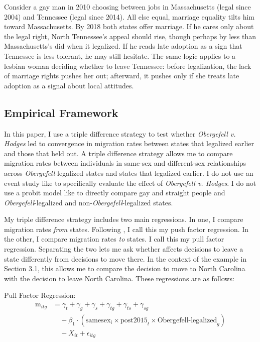 \documentclass[12pt,letterpaper]{article}
\begin{document}
Consider a gay man in 2010 choosing between jobs in Massachusetts (legal since 2004) and Tennessee (legal since 2014). All else equal, marriage equality tilts him toward Massachusetts. By 2018 both states offer marriage. If he cares only about the legal right, North Tennessee's appeal should rise, though perhaps by less than Massachusetts's did when it legalized. If he reads late adoption as a sign that Tennessee is less tolerant, he may still hesitate. The same logic applies to a lesbian woman deciding whether to leave Tennessee: before legalization, the lack of marriage rights pushes her out; afterward, it pushes only if she treats late adoption as a signal about local attitudes. 

\subsection{Empirical Framework}

In this paper, I use a triple difference strategy to test whether \textit{Obergefell v. Hodges} led to convergence in migration rates between states that legalized earlier and those that held out. A triple difference strategy allows me to compare migration rates between individuals in same-sex and different-sex relationships across \textit{Obergefell}-legalized states and states that legalized earlier. I do not use an event study like \citet{1} to specifically evaluate the effect of \textit{Obergefell v. Hodges}. I do not use a probit model like \citet{12} to directly compare gay and straight people and \textit{Obergefell}-legalized and non-\textit{Obergefell}-legalized states.

My triple difference strategy includes two main regressions. In one, I compare migration rates \textit{from} states. Following \citet{12}, I call this my push factor regression. In the other, I compare migration rates \textit{to} states. I call this my pull factor regression. Separating the two lets me ask whether affects decisions to leave a state differently from decisions to move there. In the context of the example in Section 3.1, this allows me to compare the decision to move to North Carolina with the decision to leave North Carolina. These regressions are as follows:


\hfill
\break
Pull Factor Regression:
\begin{equation}
\begin{aligned}
\text{m}_{itg} &= \gamma_t + \gamma_g + \gamma_s + \gamma_{tg} + \gamma_{ts} + \gamma_{sg} \\
&\quad + \beta_1 \cdot (\text{samesex}_i \times \text{post2015}_t \times \text{Obergefell-legalized}_g) \\
&\quad + X_{it} + \epsilon_{itg}
\end{aligned}
\end{equation}
\end{document}
